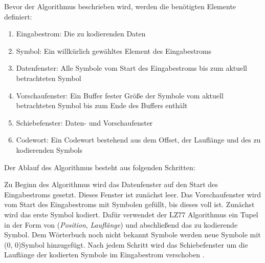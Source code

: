 Bevor der Algorithmus beschrieben wird, werden die benötigten Elemente definiert:

\begin{enumerate}
\item{Eingabestrom:} Die zu kodierenden Daten
\item{Symbol:} Ein willkürlich gewähltes Element des Eingabestroms
\item{Datenfenster:} Alle Symbole vom Start des Eingabestroms bis zum aktuell betrachteten Symbol
\item{Vorschaufenster:} Ein Buffer fester Größe der Symbole vom aktuell betrachteten Symbol bis zum Ende des Buffers enthält
\item{Schiebefenster:} Daten- und Vorschaufenster
\item{Codewort:} Ein Codewort bestehend aus dem Offset, der Lauflänge und des zu kodierenden Symbols
\end{enumerate}

Der Ablauf des Algorithmus besteht aus folgenden Schritten:

Zu Beginn des Algorithmus wird das Datenfenster auf den Start des Eingabestroms gesetzt.
Dieses Fenster ist zunächst leer.
Das Vorschaufenster wird vom Start des Eingabestroms mit Symbolen gefüllt, bis dieses voll ist.
Zunächst wird das erste Symbol kodiert.
Dafür verwendet der LZ77 Algorithmus ein Tupel in der Form von (\textit{Position}, \textit{Lauflänge}) und abschließend das zu kodierende Symbol.
Dem Wörterbuch noch nicht bekannt Symbole werden neue Symbole mit (0, 0)Symbol hinzugefügt.
Nach jedem Schritt wird das Schiebefenster um die Lauflänge der kodierten Symbole im Eingabestrom verschoben
\cite{lz2023}.

